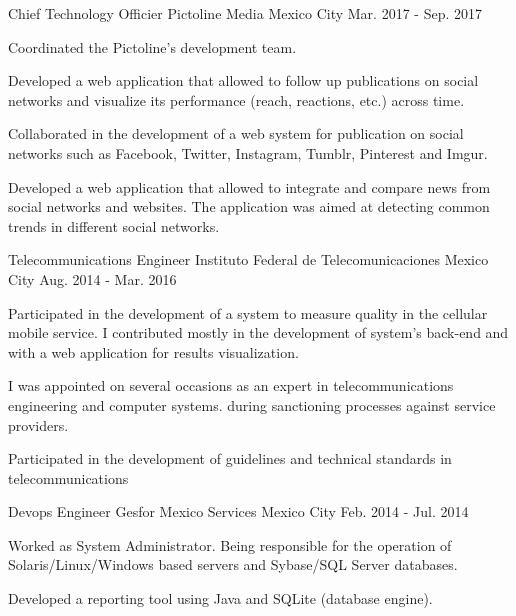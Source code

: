\begin{cventries}
  \cventry
    {Chief Technology Officier} %
    {Pictoline Media} %
    {Mexico City} %
    {Mar. 2017 - Sep. 2017} %
    {
      \begin{cvitems} %
        \item Coordinated the Pictoline's  development team.
        \item Developed a web application that allowed to follow up publications on social networks and visualize its performance (reach, reactions, etc.) across time.  
        \item Collaborated in the development of a web system for publication on social networks such as Facebook, Twitter, Instagram, Tumblr, Pinterest and Imgur.
        \item Developed a web application that allowed to integrate and compare news from social networks and websites. The application was aimed at detecting common trends in different social networks.
      \end{cvitems}
    }

  \cventry
    {Telecommunications Engineer} %
    {Instituto Federal de Telecomunicaciones} %
    {Mexico City} %
    {Aug. 2014 - Mar. 2016} %
    {
      \begin{cvitems} %
        \item Participated in the development of a system to measure quality in the cellular mobile service. I contributed mostly in the development of system's back-end and with a web application for results visualization. 
        \item I was appointed on several occasions as an %
        expert in telecommunications engineering and computer systems.  during sanctioning processes against service providers. 
        \item Participated in the development of guidelines and technical standards in telecommunications
      \end{cvitems}
    }

  \cventry
    {Devops Engineer} %
    {Gesfor Mexico Services} %
    {Mexico City} %
    {Feb. 2014 - Jul. 2014} %
    {
      \begin{cvitems} %
        \item Worked as System Administrator. Being responsible for the operation of Solaris/Linux/Windows based servers and Sybase/SQL Server databases.
        \item Developed a reporting tool using Java and SQLite (database engine).
      \end{cvitems}
    }


\end{cventries}
